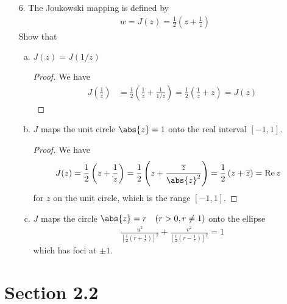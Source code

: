 \documentclass{article}
\DeclareMathOperator{\re}{Re}
\begin{document}
\begin{itemize}
	\item[6.] The Joukowski mapping is defined by
		\begin{align*}
			w=J(z) = \frac{1}{2}\left( z+\frac{1}{z} \right)
		\end{align*}
		Show that
		\begin{enumerate}[(a)]
			\item $J(z)=J(1/z)$
				\begin{proof}
					We have
					\begin{align*}
						J\left( \frac{1}{z} \right) &= \frac{1}{2} \left( \frac{1}{z} + \frac{1}{1/z} \right) = \frac{1}{2}\left( \frac{1}{z} + z \right) = J(z)
					\end{align*}
				\end{proof}

			\item $J$ maps the unit circle $\abs{z}=1$ onto the real interval $[-1, 1].$
				\begin{proof}
					We have
					\begin{align*}
						J(z) &= \frac{1}{2}\left( z+\frac{1}{z} \right) = \frac{1}{2} \left( z+\frac{\overline z}{\abs{z}^2} \right) = \frac{1}{2}\left( z+\overline z \right) = \re z
					\end{align*}
					for $z$ on the unit circle, which is the range $[-1, 1].$
				\end{proof}

			\item $J$ maps the circle $\abs{z}=r\quad (r>0, r\neq 1)$ onto the ellipse
				\begin{align*}
					\frac{u^2}{\left[ \frac{1}{2}\left( r+\frac{1}{r} \right) \right]^2} + \frac{v^2}{\left[ \frac{1}{2}\left( r-\frac{1}{r} \right) \right]^2} = 1
				\end{align*}
				which has foci at $\pm 1.$

		\end{enumerate}
		
\end{itemize}

\section*{Section 2.2}
\end{document}
